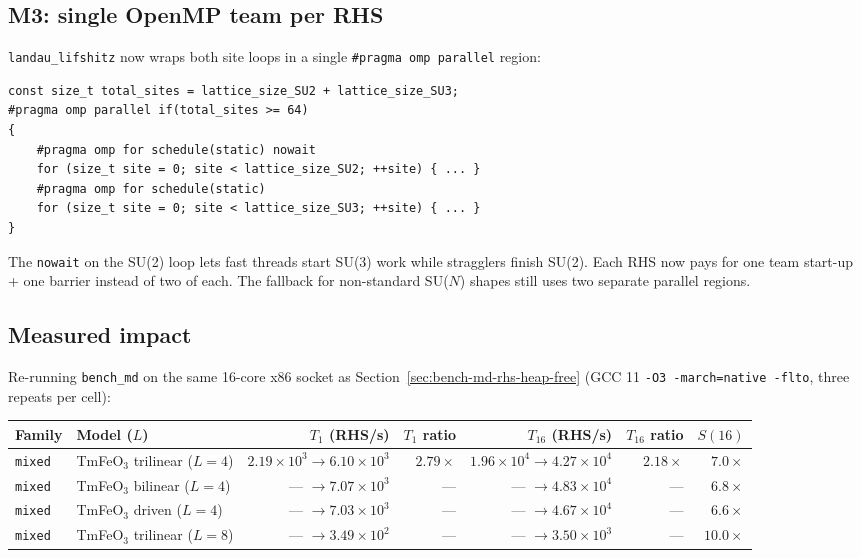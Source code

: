 \documentclass[11pt,letterpaper]{article}
\begin{document}
\subsection{M3: single OpenMP team per RHS}

\texttt{landau\_lifshitz} now wraps both site loops in a single
\texttt{\#pragma omp parallel} region:
\begin{verbatim}
const size_t total_sites = lattice_size_SU2 + lattice_size_SU3;
#pragma omp parallel if(total_sites >= 64)
{
    #pragma omp for schedule(static) nowait
    for (size_t site = 0; site < lattice_size_SU2; ++site) { ... }
    #pragma omp for schedule(static)
    for (size_t site = 0; site < lattice_size_SU3; ++site) { ... }
}
\end{verbatim}
The \texttt{nowait} on the SU(2) loop lets fast threads start SU(3)
work while stragglers finish SU(2).  Each RHS now pays for one team
start-up + one barrier instead of two of each.  The fallback for
non-standard SU($N$) shapes still uses two separate parallel regions.

\subsection{Measured impact}

Re-running \texttt{bench\_md} on the same 16-core x86 socket as
Section~\ref{sec:bench-md-rhs-heap-free} (GCC 11
\texttt{-O3 -march=native -flto}, three repeats per cell):

\begin{center}
\small
\begin{tabular}{llrrrrr}
\hline
Family & Model ($L$) & $T_1$ (RHS/s) & $T_1$ ratio & $T_{16}$ (RHS/s) & $T_{16}$ ratio & $S(16)$ \\
\hline
\texttt{mixed} & TmFeO$_3$ trilinear ($L=4$) & $2.19 \times 10^{3} \to 6.10 \times 10^{3}$ & $\mathbf{2.79\times}$ & $1.96 \times 10^{4} \to 4.27 \times 10^{4}$ & $\mathbf{2.18\times}$ & $7.0\times$ \\
\texttt{mixed} & TmFeO$_3$ bilinear  ($L=4$) & --- $\to 7.07 \times 10^{3}$ & ---                & --- $\to 4.83 \times 10^{4}$ & ---                & $6.8\times$ \\
\texttt{mixed} & TmFeO$_3$ driven    ($L=4$) & --- $\to 7.03 \times 10^{3}$ & ---                & --- $\to 4.67 \times 10^{4}$ & ---                & $6.6\times$ \\
\texttt{mixed} & TmFeO$_3$ trilinear ($L=8$) & --- $\to 3.49 \times 10^{2}$ & ---                & --- $\to 3.50 \times 10^{3}$ & ---                & $10.0\times$ \\
\hline
\end{tabular}
\end{center}
\end{document}
